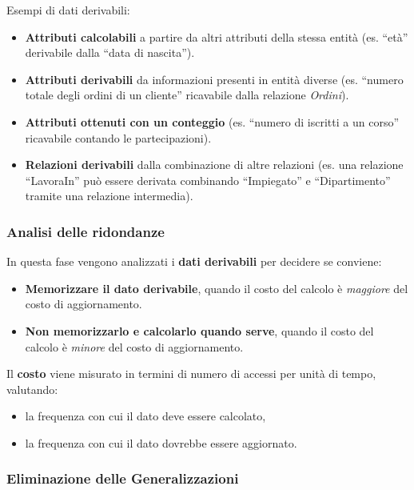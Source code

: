 Esempi di dati derivabili:
\begin{itemize}
    \item \textbf{Attributi calcolabili} a partire da altri attributi della stessa entità  
    (es. ``età'' derivabile dalla ``data di nascita'').
    
    \item \textbf{Attributi derivabili} da informazioni presenti in entità diverse  
    (es. ``numero totale degli ordini di un cliente'' ricavabile dalla relazione \textit{Ordini}).
    
    \item \textbf{Attributi ottenuti con un conteggio}  
    (es. ``numero di iscritti a un corso'' ricavabile contando le partecipazioni).
    
    \item \textbf{Relazioni derivabili} dalla combinazione di altre relazioni  
    (es. una relazione ``LavoraIn'' può essere derivata combinando ``Impiegato'' e ``Dipartimento'' tramite una relazione intermedia).
\end{itemize}
\subsubsection{Analisi delle ridondanze}

In questa fase vengono analizzati i \textbf{dati derivabili} per decidere se conviene:
\begin{itemize}
    \item \textbf{Memorizzare il dato derivabile}, quando il costo del calcolo è \emph{maggiore} del costo di aggiornamento.
    \item \textbf{Non memorizzarlo e calcolarlo quando serve}, quando il costo del calcolo è \emph{minore} del costo di aggiornamento.
\end{itemize}

Il \textbf{costo} viene misurato in termini di numero di accessi per unità di tempo, valutando:
\begin{itemize}
    \item la frequenza con cui il dato deve essere calcolato,
    \item la frequenza con cui il dato dovrebbe essere aggiornato.
\end{itemize}
\subsubsection{Eliminazione delle Generalizzazioni}

